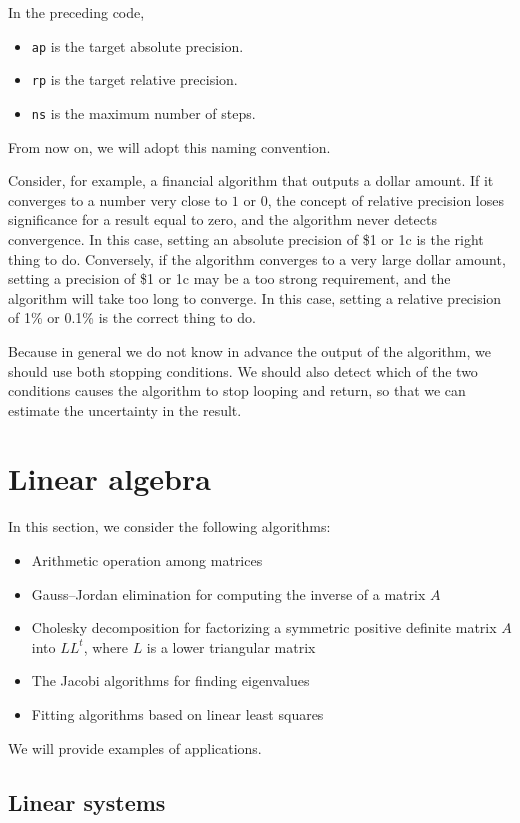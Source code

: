 \documentclass[justified, sixbynine]{tufte-book}
\def\ft{\small\tt}
\theoremstyle{plain}%
\newtheorem * {corollary}{Corollary}
\theoremstyle{definition}
\theoremstyle{remark}
\newtheorem * {remark}{Remark}
\newtheorem * {note}{Note}
\begin{document}
\begin{fullwidth}
In the preceding code,
\begin{itemize}
\item {\ft ap} is the target absolute precision.
\item {\ft rp} is the target relative precision.
\item {\ft ns} is the maximum number of steps.
\end{itemize}
From now on, we will adopt this naming convention.

Consider, for example, a financial algorithm that outputs a dollar amount. If it converges to a number very close to $1$ or $0$, the concept of relative precision loses significance for a result equal to zero, and the algorithm never detects convergence. In this case, setting an absolute precision of \$1 or 1c is the right thing to do. Conversely, if the algorithm converges to a very large dollar amount, setting a precision of \$1 or 1c may be a too strong requirement, and the algorithm will take too long to converge. In this case, setting a relative precision of 1\% or 0.1\% is the correct thing to do.

 Because in general we do not know in advance the output of the algorithm, we should use both stopping conditions. We should also detect which of the two conditions causes the algorithm to stop looping and return, so that we can estimate the uncertainty in the result.

\goodbreak\section{Linear algebra}


In this section, we consider the following algorithms:
\begin{itemize}
\item Arithmetic operation among matrices
\item Gauss--Jordan elimination for computing the inverse of a matrix $A$
\item Cholesky decomposition for factorizing a symmetric positive definite matrix $A$ into $L L^t$, where $L$ is a lower triangular matrix
\item The Jacobi algorithms for finding eigenvalues
\item Fitting algorithms based on linear least squares
\end{itemize}
We will provide examples of applications.

\goodbreak\subsection{Linear systems}


\end{fullwidth}
\end{document}
